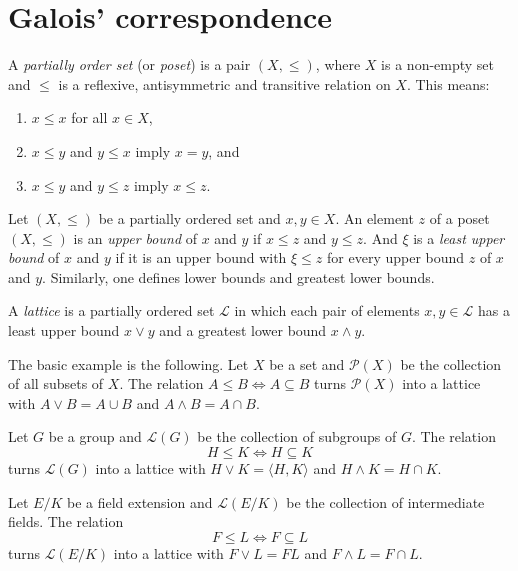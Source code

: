 
\section{Galois' correspondence}

A \emph{partially order set} (or \emph{poset}) is a pair $(X,\leq)$, where $X$ is a non-empty set
and $\leq$ is a reflexive, antisymmetric and transitive relation on $X$. This means:
\begin{enumerate}
    \item $x\leq x$ for all $x\in X$, 
    \item $x\leq y$ and $y\leq x$ imply $x=y$, and 
    \item $x\leq y$ and $y\leq z$ imply $x\leq z$. 
\end{enumerate}
Let $(X,\leq)$ be a partially ordered set and $x,y\in X$. 
An element $z$ of a poset $(X,\leq)$ is an \emph{upper bound} of $x$ and $y$ if 
$x\leq z$ and $y\leq z$. And $\xi$ 
is a \emph{least upper bound} of $x$ and $y$ 
if it is an upper bound with $\xi\leq z$ for every upper bound $z$ of $x$ and $y$. 
Similarly, one defines lower bounds and greatest lower bounds. 

\begin{definition}
    A \emph{lattice} is a partially ordered set $\mathcal{L}$ in which 
    each pair of elements $x,y\in \mathcal{L}$ has a least upper bound $x\vee y$ and a
    greatest lower bound $x\wedge y$. 
\end{definition}

The basic example is the following. 
Let $X$ be a set and $\mathcal{P}(X)$ be the collection of all subsets of $X$. The relation 
$A\leq B\Longleftrightarrow A\subseteq B$
turns $\mathcal{P}(X)$ into a lattice 
with $A\vee B=A\cup B$ and $A\wedge B=A\cap B$. 

\begin{example}
    Let $G$ be a group and $\mathcal{L}(G)$ be the collection of subgroups of $G$. The relation
    \[ 
    H\leq K\Longleftrightarrow H\subseteq K
    \] 
    turns $\mathcal{L}(G)$ into a lattice 
    with $H\vee K=\langle H,K\rangle$ and 
    $H\wedge K=H\cap K$. 
\end{example}

\begin{example}
    Let $E/K$ be a field extension and $\mathcal{L}(E/K)$ be the collection of 
    intermediate fields. The relation
    \[
    F\leq L\Longleftrightarrow F\subseteq L
    \]
    turns $\mathcal{L}(E/K)$ into a lattice with 
    $F\vee L=FL$ and $F\wedge L=F\cap L$. 
\end{example}

